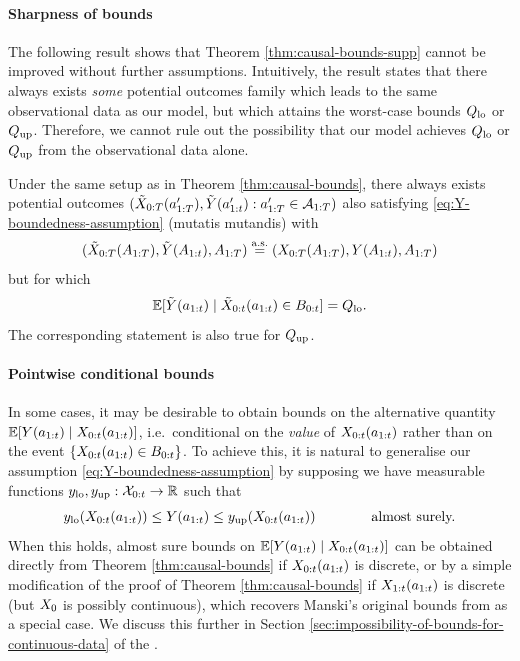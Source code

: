 %



%




%
%
%
%
%
%
%
%
%
%

\paragraph{Sharpness of bounds}

%
%
%
The following result shows that Theorem \ref{thm:causal-bounds-supp} cannot be improved without further assumptions. 
Intuitively, the result states that there always exists \emph{some} potential outcomes family which leads to the same observational data as our model, but which attains the worst-case bounds $Q_{\mathrm{lo}}$ or $Q_{\mathrm{up}}$.
Therefore, we cannot rule out the possibility that our model achieves $Q_{\mathrm{lo}}$ or $Q_{\mathrm{up}}$ from the observational data alone.
%
%
%

\begin{proposition} \label{prop:sharpness-of-bounds}
    Under the same setup as in Theorem \ref{thm:causal-bounds}, there always exists potential outcomes $(\tilde{X}_{0:T}(a_{1:T}'), \tilde{Y}(a_{1:t}') : a_{1:T}' \in \mathcal{A}_{1:T})$ also satisfying \eqref{eq:Y-boundedness-assumption} (mutatis mutandis) with 
    $$(\tilde{X}_{0:T}(A_{1:T}), \tilde{Y}(A_{1:t}), A_{1:T}) \overset{\mathrm{a.s.}}{=} (X_{0:T}(A_{1:T}), Y(A_{1:t}), A_{1:T})$$ 
    but for which $$\mathbb{E}[\tilde{Y}(a_{1:t}) \mid \tilde{X}_{0:t}(a_{1:t}) \in B_{0:t}] = Q_{\mathrm{lo}}.$$
    The corresponding statement is also true for $Q_{\mathrm{up}}$.
\end{proposition}

\paragraph{Pointwise conditional bounds}

%

%
In some cases, it may be desirable to obtain bounds on the alternative quantity $\mathbb{E}[Y(a_{1:t}) \mid X_{0:t}(a_{1:t})]$, i.e.\ conditional on the \emph{value} of $X_{0:t}(a_{1:t})$ rather than on the event $\{X_{0:t}(a_{1:t}) \in B_{0:t}\}$.
%
To achieve this, it is natural to generalise our assumption \eqref{eq:Y-boundedness-assumption} by supposing we have measurable functions $y_{\mathrm{lo}}, y_{\mathrm{up}} : \mathcal{X}_{0:t} \to \mathbb{R}$ such that
\begin{equation} \label{eq:worst-case-behaviour-functional-assumption}
    y_{\mathrm{lo}}(X_{0:t}(a_{1:t})) \leq Y(a_{1:t}) \leq y_{\mathrm{up}}(X_{0:t}(a_{1:t})) \qquad \qquad \text{almost surely.}
\end{equation}
When this holds, almost sure bounds on $\mathbb{E}[Y(a_{1:t}) \mid X_{0:t}(a_{1:t})]$ can be obtained directly from Theorem \ref{thm:causal-bounds} if $X_{0:t}(a_{1:t})$ is discrete, or by a simple modification of the proof of Theorem \ref{thm:causal-bounds} if $X_{1:t}(a_{1:t})$ is discrete (but $X_0$ is possibly continuous), which recovers Manski's original bounds from \cite{manski} as a special case.
We discuss this further in Section \ref{sec:impossibility-of-bounds-for-continuous-data} of the \AppendixName.

